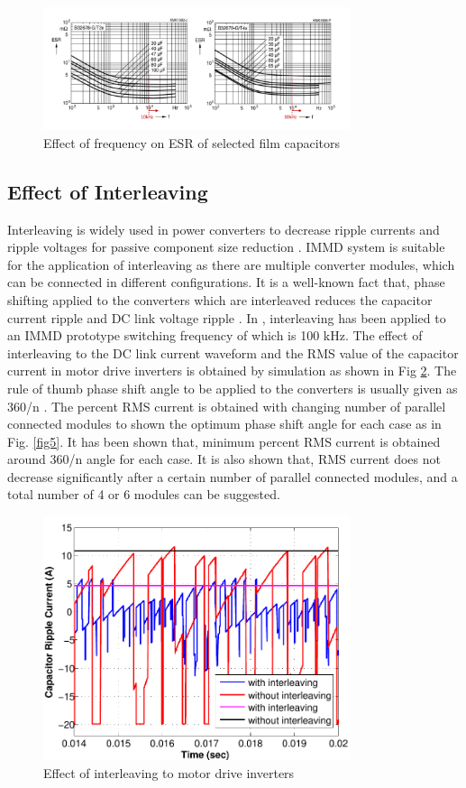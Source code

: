\documentclass[conference,a4paper,twocolumn]{IEEEtran}
\begin{document}
\begin{figure}[h]
  \centering
  \includegraphics[width=9cm]{esr}
  \caption{Effect of frequency on ESR of selected film capacitors \cite{Polypropylene2009}}
  \label{esr}
\end{figure}


\subsection{Effect of Interleaving}

Interleaving is widely used in power converters to decrease ripple currents and ripple voltages for passive component size reduction \cite{Zhang2010}. IMMD system is suitable for the application of interleaving as there are multiple converter modules, which can be connected in different configurations. It is a well-known fact that, phase shifting applied to the converters which are interleaved reduces the capacitor current ripple and DC link voltage ripple \cite{LoCalzo2016,Wang2015b,Su2010}. In \cite{Wang2015b}, interleaving has been applied to an IMMD prototype switching frequency of which is 100 kHz. The effect of interleaving to the DC link current waveform and the RMS value of the capacitor current in motor drive inverters is obtained by simulation as shown in Fig \ref{fig4}.
The rule of thumb phase shift angle to be applied to the converters is usually given as 360/n \cite{LoCalzo2016}. The percent RMS current is obtained with changing number of parallel connected modules to shown the optimum phase shift angle for each case as in Fig. \ref{fig5}. It has been shown that, minimum percent RMS current is obtained around 360/n angle for each case. It is also shown that, RMS current does not decrease significantly after a certain number of parallel connected modules, and a total number of 4 or 6 modules can be suggested.


\begin{figure}[h]
  \centering
  \includegraphics[width=9cm]{fig4_2}
  \caption{Effect of interleaving to motor drive inverters}
  \label{fig4}
\end{figure}
\end{document}
